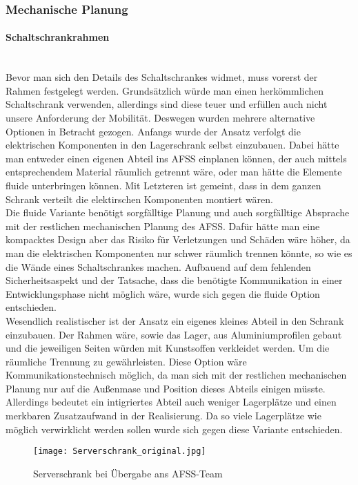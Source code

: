 \subsubsection{Mechanische Planung}

    \paragraph{Schaltschrankrahmen}\mbox{}\\
    Bevor man sich den Details des Schaltschrankes widmet, muss vorerst der Rahmen festgelegt werden. Grundsätzlich würde man einen herkömmlichen Schaltschrank verwenden, allerdings sind diese teuer und erfüllen auch nicht unsere Anforderung der Mobilität. Deswegen wurden mehrere alternative Optionen in Betracht gezogen. Anfangs wurde der Ansatz verfolgt die elektrischen Komponenten in den Lagerschrank selbst einzubauen. Dabei hätte man entweder einen eigenen Abteil ins AFSS einplanen können, der auch mittels entsprechendem Material räumlich getrennt wäre, oder man hätte die Elemente fluide unterbringen können. Mit Letzteren ist gemeint, dass in dem ganzen Schrank verteilt die elektirschen Komponenten montiert wären.\\
    Die fluide Variante benötigt sorgfälltige Planung und auch sorgfälltige Absprache mit der restlichen mechanischen Planung des AFSS. Dafür hätte man eine kompacktes Design aber das Risiko für Verletzungen und Schäden wäre höher, da man die elektrischen Komponenten nur schwer räumlich trennen könnte, so wie es die Wände eines Schaltschrankes machen. Aufbauend auf dem fehlenden Sicherheitsaspekt und der Tatsache, dass die benötigte Kommunikation in einer Entwicklungsphase nicht möglich wäre, wurde sich gegen die fluide Option entschieden.\\
    Wesendlich realistischer ist der Ansatz ein eigenes kleines Abteil in den Schrank einzubauen. Der Rahmen wäre, sowie das Lager, aus Aluminiumprofilen gebaut und die jeweiligen Seiten würden mit Kunstsoffen verkleidet werden. Um die räumliche Trennung zu gewährleisten. Diese Option wäre Kommunikationstechnisch möglich, da man sich mit der restlichen mechanischen Planung nur auf die Außenmase und Position dieses Abteils einigen müsste. Allerdings bedeutet ein intigriertes Abteil auch weniger Lagerplätze und einen merkbaren Zusatzaufwand in der Realisierung. Da so viele Lagerplätze wie möglich verwirklicht werden sollen wurde sich gegen diese Variante entschieden.\\
    \begin{wrapfigure}{r}{0.5\textwidth}
        \vspace{-30px}
        \texttt{[image: Serverschrank\_original.jpg]}
        \caption{Serverschrank bei Übergabe ans AFSS-Team}
        \vspace{-20px}
        \label{fig:Serverschrank_original}
    \end{wrapfigure}
